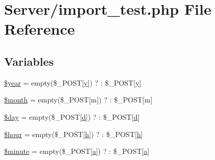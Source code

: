\hypertarget{import__test_8php}{}\section{Server/import\+\_\+test.php File Reference}
\label{import__test_8php}
\subsection*{Variables}
\begin{DoxyCompactItemize}
\item 
\hyperlink{import__test_8php_a8e992d901ac2312b3be2021ddbb7d11e}{\$year} = empty(\$\+\_\+\+P\+O\+ST\mbox{[}\textquotesingle{}\hyperlink{_w_s_8ino_a671dd85f94413cb1d3f4fa1877dded70}{y}\textquotesingle{}\mbox{]}) ? \textquotesingle{}\textquotesingle{} \+: \$\+\_\+\+P\+O\+ST\mbox{[}\textquotesingle{}\hyperlink{_w_s_8ino_a671dd85f94413cb1d3f4fa1877dded70}{y}\textquotesingle{}\mbox{]}
\item 
\hyperlink{import__test_8php_a6ba6e82c39e80d5d00afeb6f4383a549}{\$month} = empty(\$\+\_\+\+P\+O\+ST\mbox{[}\textquotesingle{}m\textquotesingle{}\mbox{]}) ? \textquotesingle{}\textquotesingle{} \+: \$\+\_\+\+P\+O\+ST\mbox{[}\textquotesingle{}m\textquotesingle{}\mbox{]}
\item 
\hyperlink{import__test_8php_a4db742f2faa33cdbae6722a11051f3bd}{\$day} = empty(\$\+\_\+\+P\+O\+ST\mbox{[}\textquotesingle{}\hyperlink{_w_s_8ino_a7e3f4a5179b8e7fc0d3cee2a12bb3f44}{d}\textquotesingle{}\mbox{]}) ? \textquotesingle{}\textquotesingle{} \+: \$\+\_\+\+P\+O\+ST\mbox{[}\textquotesingle{}\hyperlink{_w_s_8ino_a7e3f4a5179b8e7fc0d3cee2a12bb3f44}{d}\textquotesingle{}\mbox{]}
\item 
\hyperlink{import__test_8php_a54248578d000a0f9808d29c20ed18b38}{\$hour} = empty(\$\+\_\+\+P\+O\+ST\mbox{[}\textquotesingle{}\hyperlink{_w_s_8ino_a5977e838367785a7176dc7d4106df5e3}{h}\textquotesingle{}\mbox{]}) ? \textquotesingle{}\textquotesingle{} \+: \$\+\_\+\+P\+O\+ST\mbox{[}\textquotesingle{}\hyperlink{_w_s_8ino_a5977e838367785a7176dc7d4106df5e3}{h}\textquotesingle{}\mbox{]}
\item 
\hyperlink{import__test_8php_a08355553540e06b50acd4138d6254fd0}{\$minute} = empty(\$\+\_\+\+P\+O\+ST\mbox{[}\textquotesingle{}\hyperlink{_w_s_8ino_aa4c2a5552e9bc49b1816ff532f558c74}{a}\textquotesingle{}\mbox{]}) ? \textquotesingle{}\textquotesingle{} \+: \$\+\_\+\+P\+O\+ST\mbox{[}\textquotesingle{}\hyperlink{_w_s_8ino_aa4c2a5552e9bc49b1816ff532f558c74}{a}\textquotesingle{}\mbox{]}

\end{DoxyCompactItemize}
